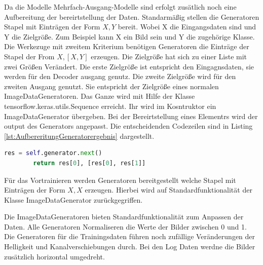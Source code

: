	Da die Modelle Mehrfach-Ausgang-Modelle sind erfolgt zusätlich noch eine Aufbereitung der bereirtstellung der Daten. Standarmäßig stellen die Generatoren Stapel mit Einträgen der Form $X ,Y$  bereit. Wobei X die Eingangsdaten sind und Y die Zielgröße. Zum Beispiel kann X ein Bild sein und Y die zugehörige Klasse. Die Werkezuge mit zweitem Kriterium benötigen Generatoren die Einträge der Stapel der From $X, [X, Y]$ erzeugen. Die Zielgröße hat sich zu einer Liste mit zwei Größen Verändert. Die erste Zielgröße ist entspricht den Eingagnsdaten, sie werden für den Decoder ausgang genutz. Die zweite Zielgröße wird für den zweiten Ausgang genutzt. Sie entspricht der Zielgröße eines normalen ImageDataGeneratoren. Das Ganze wird mit Hilfe der Klasse  tensorflow.keras.utils.Sequence erreicht. Ihr wird im Kosntruktor ein ImageDataGenerator übergeben. Bei der Bereirtstellung eines Elementrs wird der output des Generators angepasst. Die entscheidenden Codezeilen sind in Listing \ref{lst:AufbereritungGeneratorergebnis}  dargestellt. 
	\begin{lstlisting}[language=python,caption=Aufbereitung Generatorergebnis in Python, label=lst:AufbereritungGeneratorergebnis]
		res = self.generator.next()
		return res[0], [res[0], res[1]]
	\end{lstlisting}
	
	Für das Vortrainieren werden Generatoren bereitgestellt welche Stapel mit Einträgen der Form $X ,X$ erzeugen. Hierbei wird auf Standardfunktionalität der Klasse ImageDataGenerator zurückgegriffen.
	
	Die ImageDataGeneratoren bieten Standardfunktionalität zum Anpassen der Daten. Alle Generatoren Normaliseren die Werte der Bilder zwischen 0 und 1. Die Generatoren für die Trainingsdaten führen noch zufällige Veränderungen der Helligkeit und Kanalverschiebungen durch. Bei den Log Daten werdne die Bilder zusätzlich horizontal umgedreht. 


 


 
